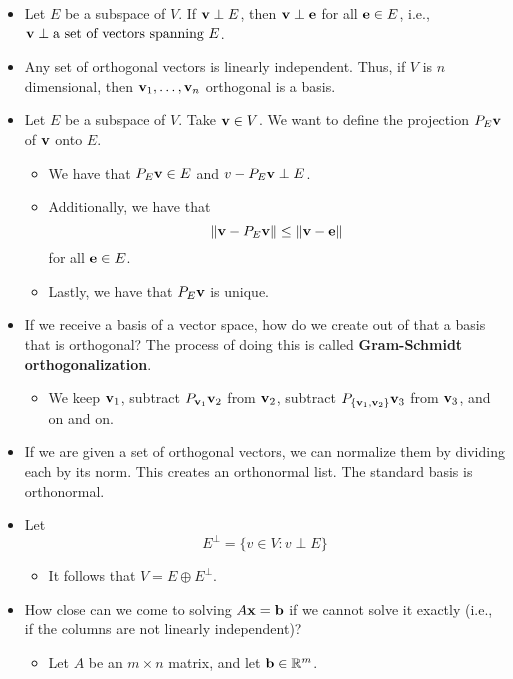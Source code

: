 \documentclass[../../notes.tex]{subfiles}
\begin{document}
\begin{itemize}
    \item Let $E$ be a subspace of $V$. If $\mathbf{v}\perp E$, then $\mathbf{v}\perp\mathbf{e}$ for all $\mathbf{e}\in E$, i.e., $\mathbf{v}\perp\text{a set of vectors spanning }E$.
    \item Any set of orthogonal vectors is linearly independent. Thus, if $V$ is $n$ dimensional, then $\mathbf{v}_1,\dots,\mathbf{v}_n$ orthogonal is a basis.
    \item Let $E$ be a subspace of $V$. Take $\mathbf{v}\in V$. We want to define the projection $P_E\mathbf{v}$ of $\mathbf{v}$ onto $E$.
    \begin{itemize}
        \item We have that $P_E\mathbf{v}\in E$ and $v-P_E\mathbf{v}\perp E$.
        \item Additionally, we have that
        \begin{equation*}
            \norm{\mathbf{v}-P_E\mathbf{v}} \leq \norm{\mathbf{v}-\mathbf{e}}
        \end{equation*}
        for all $\mathbf{e}\in E$.
        \item Lastly, we have that $P_E\mathbf{v}$ is unique.
    \end{itemize}
    \item If we receive a basis of a vector space, how do we create out of that a basis that is orthogonal? The process of doing this is called \textbf{Gram-Schmidt orthogonalization}.
    \begin{itemize}
        \item We keep $\mathbf{v}_1$, subtract $P_{\mathbf{v}_1}\mathbf{v}_2$ from $\mathbf{v}_2$, subtract $P_{\{\mathbf{v}_1,\mathbf{v}_2\}}\mathbf{v}_3$ from $\mathbf{v}_3$, and on and on.
    \end{itemize}
    \item If we are given a set of orthogonal vectors, we can normalize them by dividing each by its norm. This creates an orthonormal list. The standard basis is orthonormal.
    \item Let
    \begin{equation*}
        E^\perp = \{v\in V:v\perp E\}
    \end{equation*}
    \begin{itemize}
        \item It follows that $V=E\oplus E^\perp$.
    \end{itemize}
    \item How close can we come to solving $A\mathbf{x}=\mathbf{b}$ if we cannot solve it exactly (i.e., if the columns are not linearly independent)?
    \begin{itemize}
        \item Let $A$ be an $m\times n$ matrix, and let $\mathbf{b}\in\mathbb{R}^m$.

\end{itemize}
\end{itemize}
\end{document}
